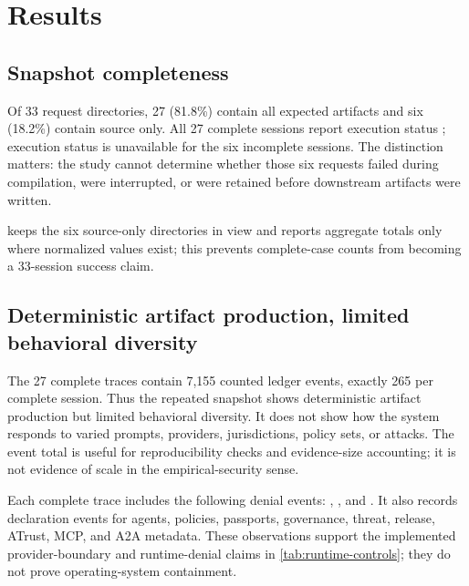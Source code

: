 \section{Results}\label{sec:results}

\subsection{Snapshot completeness}
Of 33 request directories, 27 (81.8\%) contain all expected artifacts and six
(18.2\%) contain source only.  All 27 complete sessions report execution status
; execution status is unavailable for the six incomplete
sessions.  The distinction matters: the study cannot determine whether those
six requests failed during compilation, were interrupted, or were retained
before downstream artifacts were written.

\begin{table}[t]
\centering
\caption{Empirical totals derived from the normalized snapshot. These totals
are descriptive, not broad workload evidence.}
\label{tab:empirical}

\end{table}

 keeps the six source-only directories in view and reports
aggregate totals only where normalized values exist; this prevents
complete-case counts from becoming a 33-session success claim.

\subsection{Deterministic artifact production, limited behavioral diversity}
The 27 complete traces contain 7,155 counted ledger events, exactly 265 per
complete session.  Thus the repeated snapshot shows deterministic artifact
production but limited behavioral diversity.  It does not show how the system
responds to varied prompts, providers, jurisdictions, policy sets, or attacks.
The event total is useful for reproducibility checks and evidence-size
accounting; it is not evidence of scale in the empirical-security sense.

Each complete trace includes the following denial events:
, , and
.  It also records declaration events for agents,
policies, passports, governance, threat, release, ATrust, MCP, and A2A
metadata.  These observations support the implemented provider-boundary and
runtime-denial claims in \cref{tab:runtime-controls}; they do not prove
operating-system containment.

